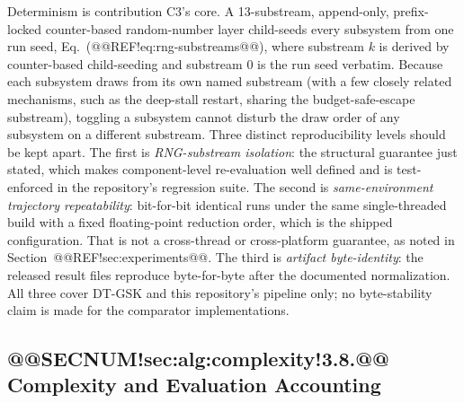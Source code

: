 \documentclass[10pt,a4paper]{article}
\newcommand{\dtgsk}{DT-GSK}
\begin{document}
Determinism is contribution C3's core.
A 13-substream, append-only, prefix-locked counter-based random-number
layer child-seeds every subsystem from one run seed,
Eq.~(@@REF!eq:rng-substreams@@), where substream $k$ is derived by
counter-based child-seeding and substream 0 is the run seed
verbatim. 
Because each subsystem draws from its own named substream (with a
few closely related mechanisms, such as the deep-stall restart, sharing
the budget-safe-escape substream), toggling a subsystem cannot
disturb the draw order of any subsystem on a different substream. Three
distinct reproducibility levels should be kept apart. The first is
\emph{RNG-substream isolation}: the structural guarantee just stated, which
makes component-level re-evaluation well defined and is test-enforced in the
repository's regression suite. The second is \emph{same-environment trajectory
repeatability}: bit-for-bit identical runs under the same single-threaded
build with a fixed floating-point reduction order, which is the shipped
configuration. That is not a cross-thread or cross-platform guarantee, as noted
in Section~@@REF!sec:experiments@@. The third is \emph{artifact byte-identity}:
the released result files reproduce byte-for-byte after the documented
normalization. All three cover \dtgsk{} and this repository's pipeline only;
no byte-stability claim is made for the comparator implementations.


\subsection{@@SECNUM!sec:alg:complexity!3.8.@@ Complexity and Evaluation Accounting}\label{sec:alg:complexity}
\end{document}
